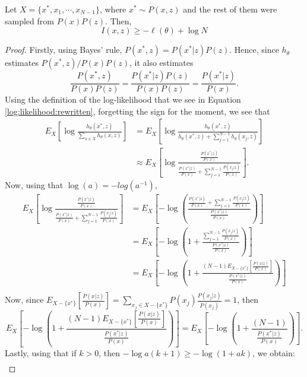 \begin{nprop}\label{Prop:Bound:NCE}
Let $X = \{x^*, x_1,\cdots,x_{N-1} \}$, where $x^* \sim P(x,z)$ and the rest of them were sampled from $P(x)P(z)$. Then,
\begin{equation}\label{Bound:NCE}
I(x,z) \geq -  \ell(\theta) + \log N
\end{equation}
\end{nprop}
\begin{proof}

Firstly, using Bayes' rule, $P(x^*,z) = P(x^*|z)P(z)$. Hence, since $h_\theta$ estimates $P(x^*,z)/P(x)P(z)$, it also estimates
\[
\frac{P(x^*,z)}{P(x)P(z)} = \frac{P(x^*|z)P(z)}{P(x)P(z)} = \frac{P(x^*|z)}{P(x)}.
\]
Using the definition of the log-likelihood that we see in Equation \eqref{log:likelihood:rewritten}, forgetting the sign for the moment, we see that
\begin{align*}
E_X \left[ \log \frac{h_\theta(x^*,z)}{\sum_{x \in X}h_\theta(x,z)}\right] & =  E_X \left[ \log \frac{h_\theta(x^*,z)}{ h_\theta(x^*,z) + \sum_{j = 1}^{N-1} h_\theta(x_j,z)}\right] \\
& \approx E_X \left[ \log \frac{\frac{P(x^*|z)}{P(x)}}{ \frac{P(x^*|z)}{P(x)} + \sum_{j = 1}^{N-1} \frac{P(x_j|z)}{P(x)}}\right].
\end{align*}
Now, using that $\log(a) = -log(a^{-1})$,
\begin{align*}
E_X \left[ \log \frac{\frac{P(x^*|z)}{P(x)}}{ \frac{P(x^*|z)}{P(x)} + \sum_{j = 1}^{N-1} \frac{P(x_j|z)}{P(x)}}\right] & = E_X\left[ -\log\left( \frac{\frac{P(x^*|z)}{P(x)} + \sum_{j = 1}^{N-1} \frac{P(x_j|z)}{P(x)}}{\frac{P(x^*|z)}{P(x)}}\right) \right] \\
& = E_X\left[ -\log\left( 1+ \frac{ \sum_{j = 1}^{N-1} \frac{P(x_j|z)}{P(x)}}{\frac{P(x^*|z)}{P(x)}} \right) \right] \\
& = E_X\left[ -\log\left( 1+ \frac{ (N-1) E_{X - \{x^*\}}\left[\frac{P(x|z)}{P(x)}\right] }{\frac{P(x^*|z)}{P(x)}}\right)\right] \\
\end{align*}
Now, since $E_{X - \{x^*\}} \left[ \frac{P(x|z)}{P(x)} \right] = \sum_{x_j \in X - \{x^*\}} P(x_j) \frac{P(x_j|z)}{P(x_j)} = 1$, then
\[
E_X\left[ -\log\left( 1+ \frac{ (N-1) E_{X - \{x^*\}}\left[\frac{P(x|z)}{P(x)}\right] }{\frac{P(x^*|z)}{P(x)}}\right)\right]  
= E_X\left[ -\log\left( 1+ \frac{ (N-1)}{\frac{P(x^*|z)}{P(x)}} \right)\right].
\] 
Lastly, using that if $k > 0$, then $- \log a(k+1) \geq -\log(1+ak)$, we obtain:
\begin{align*}

\end{align*}
\end{proof}
